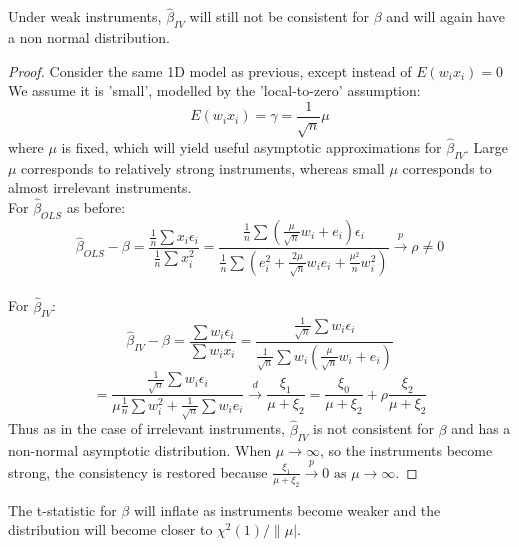 \documentclass[DIV=14,titlepage=false]{scrreprt}
\begin{document}
\begin{prop}
    Under weak instruments, \(\hat\beta_{IV}\) will still not be consistent for \(\beta\) and will again have a non normal distribution.
\end{prop}
\vspace{5mm}
\begin{proof}
Consider the same 1D model as previous, except instead of \(E(w_ix_i)=0\) We assume it is 'small', modelled by the 'local-to-zero' assumption:
\[E(w_ix_i)=\gamma=\frac{1}{\sqrt{n}}\mu\]
where \(\mu\) is fixed, which will yield useful asymptotic approximations for \(\hat\beta_{IV}\).
Large \(\mu\) corresponds to relatively strong instruments, whereas small \(\mu\) corresponds to almost irrelevant instruments.
\\ For \(\hat\beta_{OLS}\) as before:
\[\hat\beta_{OLS}-\beta=\frac{\frac{1}{n}\sum x_i\epsilon_i}{\frac{1}{n}\sum x_i^2}=\frac{\frac{1}{n}\sum (\frac{\mu}{\sqrt{n}}w_i+e_i)\epsilon_i}{\frac{1}{n}\sum (e_i^2+\frac{2\mu}{\sqrt{n}}w_ie_i+\frac{\mu^2}{n}w_i^2)}\xrightarrow{p}\rho\neq0\]
\\ For \(\hat\beta_{IV}\):
\[\hat\beta_{IV}-\beta=\frac{\sum w_i\epsilon_i}{\sum w_ix_i}=\frac{\frac{1}{\sqrt{n}}\sum w_i\epsilon_i}{\frac{1}{\sqrt{n}}\sum w_i(\frac{\mu}{\sqrt{n}}w_i+e_i)}\]
\[=\frac{\frac{1}{\sqrt{n}}\sum w_i\epsilon_i}{\mu\frac{1}{n}\sum w_i^2+\frac{1}{\sqrt{n}}\sum w_ie_i}\xrightarrow{d}\frac{\xi_1}{\mu+\xi_2}=\frac{\xi_0}{\mu+\xi_2}+\rho\frac{\xi_2}{\mu+\xi_2}\]
Thus as in the case of irrelevant instruments, \(\hat\beta_{IV}\) is not consistent for \(\beta\) and has a non-normal asymptotic distribution.
When \(\mu\rightarrow\infty\), so the instruments become strong, the consistency is restored because \(\frac{\xi_1}{\mu+\xi_2}\xrightarrow{p}0\text{ as }\mu\rightarrow\infty\).
\end{proof}
\vspace{5mm}
\begin{prop}
The t-statistic for \(\beta\) will inflate as instruments become weaker and the distribution will become closer to \(\chi^2(1)/\|\mu|\). 
\end{prop}
\vspace{5mm}
\end{document}
